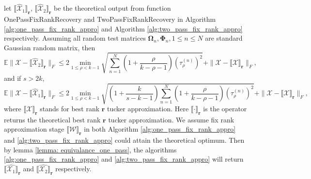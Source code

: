 \begin{cor}
\label{corollary:fix_rank_err}
let  $\llbracket \hat{\mathscr{X}}_1 \rrbracket_\mathbf{r}$, $\llbracket \hat{\mathscr{X}}_2\rrbracket_\mathbf{r}$ be the theoretical output from function OnePassFixRankRecovery and TwoPassFixRankRecovery in Algorithm \ref{alg:one_pass_fix_rank_appro} and Algorithm \ref{alg:two_pass_fix_rank_appro} respectively. Assuming all random test matrices $\mathbf{\Omega}_n, \mathbf{\Phi}_n, 1\le n\le N$ are standard Gaussian random matrix, then
\begin{equation}
\mathbb{E} \|\mathscr{X} - \llbracket \hat{\mathscr{X}}_2\rrbracket_\mathbf{r}\|_F \le 2\min_{1\le \rho<k-1}\sqrt{\sum_{n=1}^N \left(1+\frac{\rho}{k-\rho-1}\right)(\tau^{(n)}_\rho)^2}+\|\mathscr{X} - \llbracket \mathscr{X}\rrbracket_\mathbf{r}\|_F, 
\end{equation}
and if $s>2k$, 
\begin{equation}
\mathbb{E} \|\mathscr{X} - \llbracket \hat{\mathscr{X}}_1\rrbracket_\mathbf{r}\|_F \le 2\min_{1\le \rho<k-1}\sqrt{\left(1+\frac{k}{s-k-1}\right)\sum_{n=1}^N \left(1+\frac{\rho}{k-\rho-1}\right)(\tau^{(n)}_\rho)^2}+\|\mathscr{X} - \llbracket \mathscr{X}\rrbracket_\mathbf{r}\|_F,
\end{equation}
where $\llbracket \mathscr{X} \rrbracket_\mathbf{r}$ stands for best rank $\mathbf{r}$ tucker approximation. Here $\llbracket \cdot \rrbracket_\mathbf{r}$ is the operator returns
the theoretical best rank $\mathbf{r}$ tucker approximation. We assume fix rank approximation stage $\llbracket \mathscr{W} \rrbracket_\mathbf{r}$ in both Algorithm \ref{alg:one_pass_fix_rank_appro} and \ref{alg:two_pass_fix_rank_appro} could attain the theoretical optimum. Then by lemma \ref{lemma: equivalance_one_pass}, the algorithms \ref{alg:one_pass_fix_rank_appro} and \ref{alg:two_pass_fix_rank_appro} will return $\llbracket \hat{\mathscr{X}_1} \rrbracket_\mathbf{r}$ and $\llbracket \hat{\mathscr{X}_2} \rrbracket_\mathbf{r}$ respectively. 
\end{cor}
